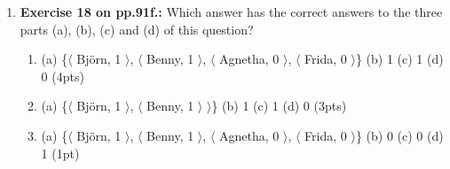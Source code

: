 \documentclass[a4,11pt]{article}
\begin{document}
\begin{enumerate}[leftmargin = 12pt]
\begin{enumerate}[noitemsep]
        \item (a) Bj\"orn (b) false (c) true (3pts)
        
         \item (a) Bj\"orn (b) true (c) true (2pts)
         
          \item (a) Bj\"orn (b) false (c) false (2pts)
          
          \item (a) Agnetha (b) false (c) true (2pts)
        
         \item (a) Agnetha (b) true (c) true (1pt)
         
          \item (a) Agnetha (b) false (c) false (1pt)
         
\end{enumerate}

{\bf Model answer:} Answer (a) is the correct answer. For part (a), the `partner' function maps Agnetha to Bj\"orn, as represented by the pair $\langle$ Agnetha, Bj\"orn $\rangle$. 

For part (b), the `partner' function maps Bj\"orn to Agnetha, not to Frida, so the statement is false. 

For part (c), the `partner' function maps Bj\"orn to Agnetha, so $f(f($Bj\"orn$))$ is $f($Agnetha$)$, which is identical to the expression to the right of the equal sign.

\item {\bf Exercise 18 on pp.91f.:} Which answer has the correct answers to the three parts (a), (b), (c) and (d) of this question? 

\begin{enumerate}[noitemsep]
        \item (a) \{$\langle$ Bj\"orn, 1 $\rangle$, $\langle$ Benny, 1 $\rangle$, $\langle$ Agnetha, 0 $\rangle$, $\langle$ Frida, 0 $\rangle$\} (b) 1 (c)  1 (d) 0 (4pts)
        
     \item (a) \{$\langle$ Bj\"orn, 1 $\rangle$, $\langle$ Benny, 1 $\rangle$ $\rangle$\} (b) 1 (c)  1 (d) 0 (3pts)
     
      \item (a) \{$\langle$ Bj\"orn, 1 $\rangle$, $\langle$ Benny, 1 $\rangle$, $\langle$ Agnetha, 0 $\rangle$, $\langle$ Frida, 0 $\rangle$\} (b) 0  (c)  0 (d) 1  (1pt)
      

\end{enumerate}
\end{enumerate}
\end{document}
